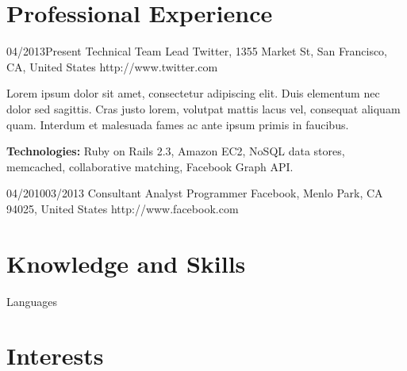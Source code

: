\documentclass[10pt]{article} %
\begin{document}
\section*{Professional Experience}

\begin{job}
  {04/2013}{Present}
  {Technical Team Lead}
  {Twitter, 1355 Market St, San Francisco, CA, United States}
  {http://www.twitter.com}
  {Lorem ipsum dolor sit amet, consectetur adipiscing elit. Duis elementum nec dolor sed sagittis. Cras justo lorem, volutpat mattis lacus vel, consequat aliquam quam. Interdum et malesuada fames ac ante ipsum primis in faucibus.\\
    \rule{0mm}{5mm}\textbf{Technologies:} Ruby on Rails 2.3, Amazon EC2, NoSQL data stores, memcached, collaborative matching, Facebook Graph API.}
\end{job}


\begin{jobshort}
  {04/2010}{03/2013}
  {Consultant Analyst Programmer}
  {Facebook, Menlo Park, CA 94025, United States}
  {http://www.facebook.com}
\end{jobshort}

\section*{Knowledge and Skills}


\begin{skillgroup}{Languages}
\end{skillgroup}


\section*{Interests}


\end{document}
